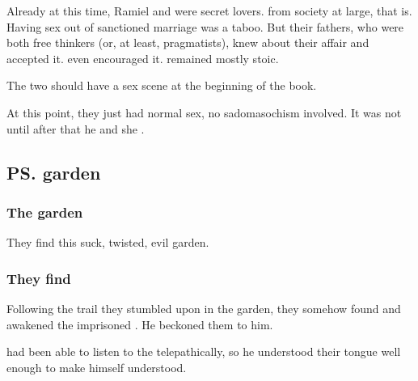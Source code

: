 Already at this time, Ramiel and \Shiaraid{} were secret lovers. 
 from society at large, that is. 
Having sex out of sanctioned marriage was a taboo. 
But their fathers, who were both free thinkers (or, at least, pragmatists), knew about their affair and accepted it. 
\Zachirah{} even encouraged it.
\Nathrach{} remained mostly stoic. 

The two should have a  sex scene at the beginning of the book. 

At this point, they just had normal sex, no sadomasochism involved. 
It was not until after \Semiza{} that he  and she . 









\subsection{\ps{\Semiza}{} garden}
\subsubsection{The garden}
They find this suck, twisted, evil garden. 






\subsubsection{They find \Semiza}
Following the trail they stumbled upon in the garden, they somehow found and awakened the imprisoned . 
He beckoned them to him. 

\Semiza{} had been able to listen to the \resphain{} telepathically, so he understood their tongue well enough to make himself understood. 

